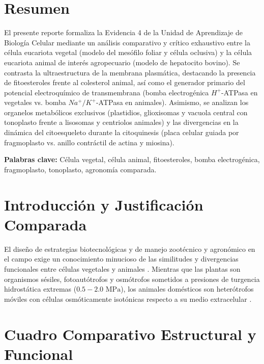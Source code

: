 \documentclass[spanish,letterpaper,oneside]{article}
\begin{document}
\hypersetup{pageanchor=false}
\begingroup
\fontsize{14}{17}\selectfont
\renewcommand{\Huge}{\fontsize{14}{17}\selectfont\bfseries}
\renewcommand{\large}{\fontsize{14}{17}\selectfont}
\templatePortrait
\clearpage
\endgroup
\hypersetup{pageanchor=true}
\templatePagecfg
\singlespacing
\setlength{\tabcolsep}{8pt}
\renewcommand{\arraystretch}{1.18}

\section*{Resumen}
El presente reporte formaliza la Evidencia 4 de la Unidad de Aprendizaje de Biología Celular mediante un análisis comparativo y crítico exhaustivo entre la célula eucariota vegetal (modelo del mesófilo foliar y célula oclusiva) y la célula eucariota animal de interés agropecuario (modelo de hepatocito bovino). Se contrasta la ultraestructura de la membrana plasmática, destacando la presencia de fitoesteroles frente al colesterol animal, así como el generador primario del potencial electroquímico de transmembrana (bomba electrogénica $H^+$-ATPasa en vegetales vs. bomba $Na^+/K^+$-ATPasa en animales). Asimismo, se analizan los organelos metabólicos exclusivos (plastidios, glioxisomas y vacuola central con tonoplasto frente a lisosomas y centriolos animales) y las divergencias en la dinámica del citoesqueleto durante la citoquinesis (placa celular guiada por fragmoplasto vs. anillo contráctil de actina y miosina).

\vspace{0.4cm}
\noindent\textbf{Palabras clave:} Célula vegetal, célula animal, fitoesteroles, bomba electrogénica, fragmoplasto, tonoplasto, agronomía comparada.

\section{Introducción y Justificación Comparada}
El diseño de estrategias biotecnológicas y de manejo zootécnico y agronómico en el campo exige un conocimiento minucioso de las similitudes y divergencias funcionales entre células vegetales y animales \parencite{alberts2015}. Mientras que las plantas son organismos sésiles, fotoautótrofos y osmótrofos sometidos a presiones de turgencia hidrostática extremas ($0.5-2.0\text{ MPa}$), los animales domésticos son heterótrofos móviles con células osmóticamente isotónicas respecto a su medio extracelular \parencite{taiz2015, lodish2016}.

\section{Cuadro Comparativo Estructural y Funcional}
\end{document}
